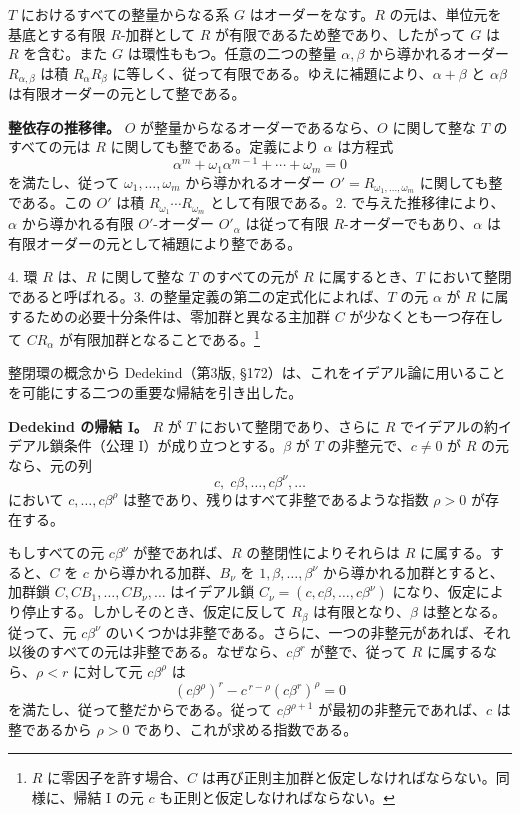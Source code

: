 \documentclass[11pt]{article}
\begin{document}
$T$ におけるすべての整量からなる系 $G$ はオーダーをなす。$R$ の元は、単位元を基底とする有限 $R$-加群として $R$ が有限であるため整であり、したがって $G$ は $R$ を含む。また $G$ は環性ももつ。任意の二つの整量 $\alpha,\beta$ から導かれるオーダー $R_{\alpha,\beta}$ は積 $R_\alpha R_\beta$ に等しく、従って有限である。ゆえに補題により、$\alpha+\beta$ と $\alpha\beta$ は有限オーダーの元として整である。

\medskip
\noindent\textbf{整依存の推移律。} $O$ が整量からなるオーダーであるなら、$O$ に関して整な $T$ のすべての元は $R$ に関しても整である。定義により $\alpha$ は方程式
\[
        \alpha^m+\omega_1\alpha^{m-1}+\cdots+\omega_m=0
\]
を満たし、従って $\omega_1,\ldots,\omega_m$ から導かれるオーダー $O'=R_{\omega_1,\ldots,\omega_m}$ に関しても整である。この $O'$ は積 $R_{\omega_1}\cdots R_{\omega_m}$ として有限である。2. で与えた推移律により、$\alpha$ から導かれる有限 $O'$-オーダー $O'_\alpha$ は従って有限 $R$-オーダーでもあり、$\alpha$ は有限オーダーの元として補題により整である。

4. 環 $R$ は、$R$ に関して整な $T$ のすべての元が $R$ に属するとき、$T$ において整閉であると呼ばれる。3. の整量定義の第二の定式化によれば、$T$ の元 $\alpha$ が $R$ に属するための必要十分条件は、零加群と異なる主加群 $C$ が少なくとも一つ存在して $CR_\alpha$ が有限加群となることである。\footnote{$R$ に零因子を許す場合、$C$ は再び正則主加群と仮定しなければならない。同様に、帰結 I の元 $c$ も正則と仮定しなければならない。}

整閉環の概念から Dedekind（第3版, §172）は、これをイデアル論に用いることを可能にする二つの重要な帰結を引き出した。

\medskip
\noindent\textbf{Dedekind の帰結 I。} $R$ が $T$ において整閉であり、さらに $R$ でイデアルの約イデアル鎖条件（公理 I）が成り立つとする。$\beta$ が $T$ の非整元で、$c\ne0$ が $R$ の元なら、元の列
\[
        c,\;c\beta,\ldots,c\beta^\nu,\ldots
\]
において $c,\ldots,c\beta^\rho$ は整であり、残りはすべて非整であるような指数 $\rho>0$ が存在する。

もしすべての元 $c\beta^\nu$ が整であれば、$R$ の整閉性によりそれらは $R$ に属する。すると、$C$ を $c$ から導かれる加群、$B_\nu$ を $1,\beta,\ldots,\beta^\nu$ から導かれる加群とすると、加群鎖 $C,CB_1,\ldots,CB_\nu,\ldots$ はイデアル鎖 $C_\nu=(c,c\beta,\ldots,c\beta^\nu)$ になり、仮定により停止する。しかしそのとき、仮定に反して $R_\beta$ は有限となり、$\beta$ は整となる。従って、元 $c\beta^\nu$ のいくつかは非整である。さらに、一つの非整元があれば、それ以後のすべての元は非整である。なぜなら、$c\beta^r$ が整で、従って $R$ に属するなら、$\rho<r$ に対して元 $c\beta^\rho$ は
\[
        (c\beta^\rho)^r-c^{\,r-\rho}(c\beta^r)^\rho=0
\]
を満たし、従って整だからである。従って $c\beta^{\rho+1}$ が最初の非整元であれば、$c$ は整であるから $\rho>0$ であり、これが求める指数である。
\end{document}
